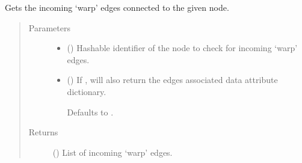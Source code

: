 \documentclass[letterpaper,10pt,english]{sphinxmanual}
\begin{document}
\begin{fulllineitems}
\begin{fulllineitems}
\begin{quote}
\begin{description}
\end{description}\end{quote}

\end{fulllineitems}


\begin{fulllineitems}
\label{\detokenize{cockatoo:cockatoo.KnitDiNetwork.node_warp_edges_in}}
Gets the incoming ‘warp’ edges connected to the given node.
\begin{quote}\begin{description}
\item[{Parameters}] \leavevmode\begin{itemize}
\item {} 
 () \textendash{} Hashable identifier of the node to check for incoming ‘warp’ edges.

\item {} 
 (\sphinxstyleliteralemphasis{\sphinxupquote{, }}) \textendash{} 
If , will also return the edges associated data attribute
dictionary.

Defaults to .


\end{itemize}

\item[{Returns}] \leavevmode
{} () \textendash{} List of incoming ‘warp’ edges.

\end{description}\end{quote}

\end{fulllineitems}



\end{fulllineitems}
\end{document}
